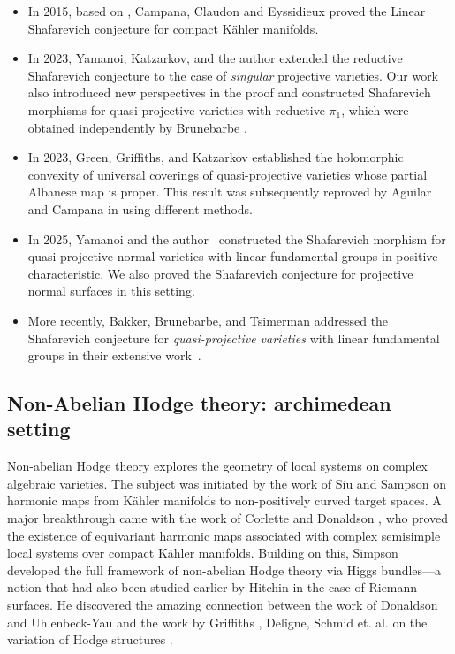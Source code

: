\documentclass[english]{amsproc}
\theoremstyle{plain}
\theoremstyle{definition}
\theoremstyle{remark}
\theoremstyle{plain}
\numberwithin{equation}{thm} %
\begin{document}
\begin{itemize}
	
	\item In 2015, based on \cite{EKPR12}, Campana, Claudon and Eyssidieux  \cite{CCE15} proved the Linear Shafarevich conjecture for compact K\"ahler manifolds. 
	
	\item In 2023, Yamanoi, Katzarkov, and the author \cite{DY23} extended the reductive Shafarevich conjecture 
	to the case of \emph{singular} projective varieties. 
	Our work also introduced new perspectives in the proof and constructed Shafarevich morphisms 
	for quasi-projective varieties with reductive $\pi_1$,  which were obtained independently 
	by Brunebarbe \cite{Bru23}.
	
	\item In 2023, Green, Griffiths, and Katzarkov established the holomorphic convexity of universal coverings of quasi-projective varieties whose partial Albanese map is proper. This result was subsequently reproved by Aguilar and Campana in \cite{AC25} using different methods.
	
	\item In 2025, Yamanoi and the author~\cite{DY23b} constructed the Shafarevich morphism for quasi-projective normal varieties with linear fundamental groups in positive characteristic. We also proved the Shafarevich conjecture for projective normal surfaces in this setting.
	
	\item More recently, Bakker, Brunebarbe, and Tsimerman addressed the Shafarevich conjecture for \emph{quasi-projective varieties} with linear fundamental groups in their extensive work~\cite{BBT24}.
\end{itemize}
\subsection{Non-Abelian Hodge theory: archimedean setting}
Non-abelian Hodge theory explores  the geometry of local systems on complex algebraic varieties. The subject was initiated by the work of Siu \cite{Siu80} and Sampson \cite{Sam86} on harmonic maps from Kähler manifolds to non-positively curved target spaces. A major breakthrough came with the work of Corlette \cite{Cor88} and Donaldson \cite{Don87}, who proved the existence of equivariant harmonic maps associated with complex semisimple local systems over compact Kähler manifolds. Building on this, Simpson developed the full framework of non-abelian Hodge theory via Higgs bundles—a notion that had also been studied earlier by Hitchin \cite{Hit87} in the case of Riemann surfaces. He discovered the amazing connection between the work of Donaldson \cite{Don87b} and Uhlenbeck-Yau \cite{UY86} and the work by Griffiths \cite{Gri70}, Deligne, Schmid  et. al. on the variation of Hodge structures \cite{Sim88,Sim92}. 
\end{document}
